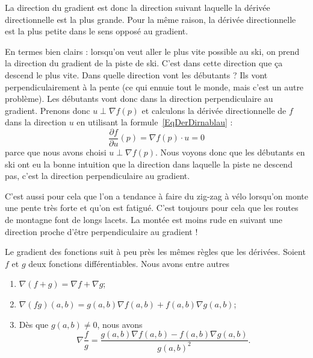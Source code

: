 La direction du gradient est donc la direction suivant laquelle la dérivée directionnelle est la plus grande. Pour la même raison, la dérivée directionnelle est la plus petite dans le sens opposé au gradient.

En termes bien clairs : lorsqu'on veut aller le plus vite possible au ski, on prend la direction du gradient de la piste de ski. C'est dans cette direction que ça descend le plus vite. Dans quelle direction vont les débutants ? Ils vont perpendiculairement à la pente (ce qui ennuie tout le monde, mais c'est un autre problème). Les débutants vont donc dans la direction perpendiculaire au gradient. Prenons donc \( u\perp \nabla f(p)\) et calculons la dérivée directionnelle de \( f\) dans la direction \( u\) en utilisant la formule~\ref{EqDerDirnablau} :
\begin{equation}
	\frac{ \partial f }{ \partial u }(p)=\nabla f(p)\cdot u=0
\end{equation}
parce que nous avons choisi \( u\perp \nabla f(p)\). Nous voyons donc que les débutants en ski ont eu la bonne intuition que la direction dans laquelle la piste ne descend pas, c'est la direction perpendiculaire au gradient.

C'est aussi pour cela que l'on a tendance à faire du zig-zag à vélo lorsqu'on monte une pente très forte et qu'on est fatigué. C'est toujours pour cela que les routes de montagne font de longs lacets. La montée est moins rude en suivant une direction proche d'être perpendiculaire au gradient !

\begin{theorem}
	Le gradient des fonctions suit à peu près les mêmes règles que les dérivées. Soient \( f\) et \( g\) deux fonctions différentiables. Nous avons entre autres
	\begin{enumerate}
		\item
		      \( \nabla(f+g)=\nabla f+\nabla g\);
		\item
		      \( \nabla(fg)(a,b)=g(a,b)\nabla f(a,b)+f(a,b)\nabla g(a,b)\);
		\item
		      Dès que \( g(a,b)\neq 0\), nous avons
		      \begin{equation}
			      \nabla\frac{ f }{ g }=\frac{ g(a,b)\nabla f(a,b)-f(a,b)\nabla g(a,b) }{ g(a,b)^2 }.
		      \end{equation}
	\end{enumerate}
\end{theorem}

